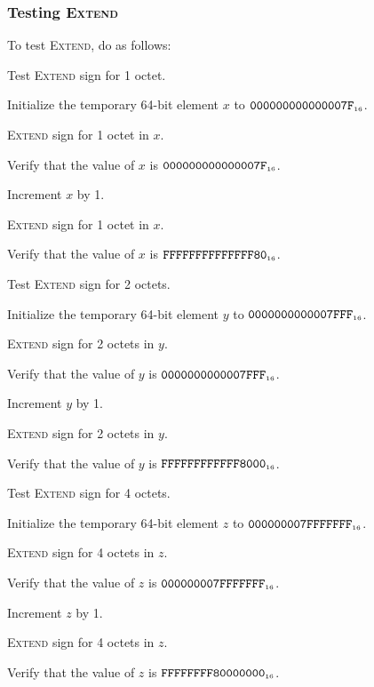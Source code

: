 \documentclass[a4paper,12pt]{article}
\newcommand{\num}[1]{\texttt{#1}}
\newcommand{\hex}[1]{\num{#1}_{\textup{\tiny 16}}}
\newcommand{\proc}[1]{\textsc{#1}}
\begin{document}
\subsubsection{Testing \proc{Extend}}

To test \proc{Extend}, do as follows:
\begin{stepletters}
\item Test \proc{Extend} sign for 1 octet.
  \begin{stepnumbers}
  \item Initialize the temporary 64-bit element $x$ to $\hex{000000000000007F}$.
  \item \proc{Extend} sign for 1 octet in $x$.
  \item Verify that the value of $x$ is $\hex{000000000000007F}$.
  \item Increment $x$ by 1.
  \item \proc{Extend} sign for 1 octet in $x$.
  \item Verify that the value of $x$ is $\hex{FFFFFFFFFFFFFF80}$.
  \end{stepnumbers}
\item Test \proc{Extend} sign for 2 octets.
  \begin{stepnumbers}
  \item Initialize the temporary 64-bit element $y$ to $\hex{0000000000007FFF}$.
  \item \proc{Extend} sign for 2 octets in $y$.
  \item Verify that the value of $y$ is $\hex{0000000000007FFF}$.
  \item Increment $y$ by 1.
  \item \proc{Extend} sign for 2 octets in $y$.
  \item Verify that the value of $y$ is $\hex{FFFFFFFFFFFF8000}$.
  \end{stepnumbers}
\item Test \proc{Extend} sign for 4 octets.
  \begin{stepnumbers}
  \item Initialize the temporary 64-bit element $z$ to $\hex{000000007FFFFFFF}$.
  \item \proc{Extend} sign for 4 octets in $z$.
  \item Verify that the value of $z$ is $\hex{000000007FFFFFFF}$.
  \item Increment $z$ by 1.
  \item \proc{Extend} sign for 4 octets in $z$.
  \item Verify that the value of $z$ is $\hex{FFFFFFFF80000000}$.
  \end{stepnumbers}
\end{stepletters}
\end{document}
